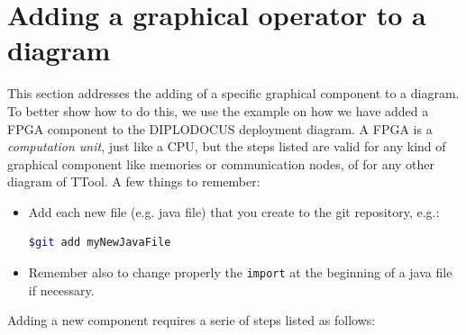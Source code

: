 \documentclass[12pt]{article}
\begin{document}
\section{Adding a graphical operator to a diagram}
This section addresses the adding of a specific graphical component to a diagram. To better show how to do this, we use the example on how we have added a FPGA component to the DIPLODOCUS deployment diagram. A FPGA is a \textit{computation unit}, just like a CPU, but the steps listed are valid for any kind of graphical component like memories or communication nodes, of for any other diagram of TTool. A few things to remember:
\begin{itemize}
\item Add each new file (e.g. java file) that you create to the git repository, e.g.:
\begin{lstlisting}[showspaces=true, language=bash, commentstyle=\color{pgreen},
keywordstyle=\color{pblue}, stringstyle=\color{pred}, basicstyle=\ttfamily]
$git add myNewJavaFile
\end{lstlisting}
\item Remember also to change properly the \texttt{import} at the beginning of a java file if necessary. 
\end{itemize}
Adding a new component requires a serie of steps listed as follows: 
\end{document}
